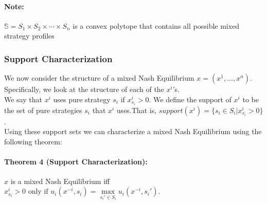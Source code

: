 \documentclass[12pt]{article}
\newcommand{\Note}{\paragraph{Note:}}
\begin{document}
\Note $\mathbb{S} = S_1 \times S_2 \times \cdots \times S_n$ is a convex polytope that contains all possible mixed strategy profiles \cite{26}

\subsubsection{Support Characterization}

We now consider the structure of a mixed Nash Equilibrium $x = (x^1,..., x^n)$. Specifically, we look at the structure of each of the $x^i$’s.\\

We say that $x^i$ uses pure strategy $s_i$ if $x^i_{s_i} > 0$. We define the support of $x^i$ to be the set of pure strategies $s_i$ that $x^i$ uses.That is, $support(x^i) = \{s_i \in S_i | x^i_{s_i} > 0\}$.\\
 
Using these support sets we can characterize a mixed Nash Equilibrium using the following theorem:

\paragraph{Theorem 4 (Support Characterization):}$x$ is a mixed Nash Equilibrium iff $x^i_{s_i} > 0 \text{ only if } u_i(x^{-i}, s_i) = \max\limits_{ s_i' \in S_i} u_i(x^{-i}, s_i').$
\end{document}
